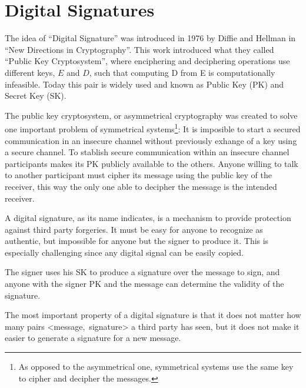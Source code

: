 \section{Digital Signatures}
The idea of ``Digital Signature'' was introduced in 1976 by Diffie and
  Hellman in ``New Directions in Cryptography''\cite{diffie1976new}. This work
  introduced what they called ``Public Key Cryptosystem'', where enciphering and
  deciphering operations use different keys, $E$ and $D$, such that computing D
  from E is computationally infeasible.
Today this pair is widely used and known as Public Key (PK) and Secret Key (SK).

The public key cryptosystem, or asymmetrical cryptography was created to solve
  one important problem of symmetrical systems\footnote{As opposed to the
  asymmetrical one, symmetrical systems use the same key to cipher and decipher
  the messages.}: It is imposible to start a secured communication in an
  insecure channel without previously exhange of a key using a secure channel.
To stablish secure communication within an insecure channel participants makes
  its PK publicly available to the others.
Anyone willing to talk to another participant must cipher its message using the
  public key of the receiver, this way the only one able to decipher the message
  is the intended receiver.

A digital signature, as its name indicates, is a mechanism to provide protection
  against third party forgeries. It must be easy for anyone to recognize as
  authentic, but impossible for anyone but the signer to produce it. This is
  especially challenging since any digital signal can be easily copied.

The signer uses his SK to produce a signature over the message to sign, and
  anyone with the signer PK and the message can determine the validity of the
  signature.

The most important property of a digital signature is that it does not matter how
  many pairs \mbox{\textless message, signature\textgreater} a third party has
  seen, but it does not make it easier to generate a signature for a new
  message.
